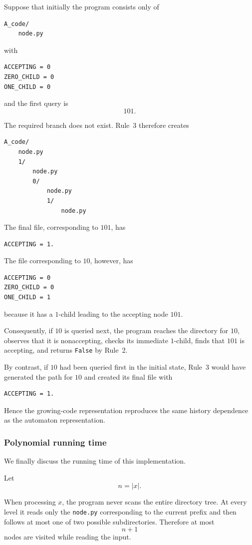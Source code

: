 \documentclass[11pt]{article}
\begin{document}
Suppose that initially the program consists only of
\begin{verbatim}
A_code/
    node.py
\end{verbatim}
with
\begin{verbatim}
ACCEPTING = 0
ZERO_CHILD = 0
ONE_CHILD = 0
\end{verbatim}

and the first query is
\[
101.
\]

The required branch does not exist.  Rule~3 therefore creates
\begin{verbatim}
A_code/
    node.py
    1/
        node.py
        0/
            node.py
            1/
                node.py
\end{verbatim}

The final file, corresponding to \(101\), has
\begin{verbatim}
ACCEPTING = 1.
\end{verbatim}

The file corresponding to \(10\), however, has
\begin{verbatim}
ACCEPTING = 0
ZERO_CHILD = 0
ONE_CHILD = 1
\end{verbatim}

because it has a \(1\)-child leading to the accepting node \(101\).

Consequently, if \(10\) is queried next, the program reaches the directory
for \(10\), observes that it is nonaccepting, checks its immediate
\(1\)-child, finds that \(101\) is accepting, and returns
\texttt{False} by Rule~2.

By contrast, if \(10\) had been queried first in the initial state,
Rule~3 would have generated the path for \(10\) and created its final file
with
\begin{verbatim}
ACCEPTING = 1.
\end{verbatim}

Hence the growing-code representation reproduces the same history
dependence as the automaton representation.

\subsubsection*{Polynomial running time}

We finally discuss the running time of this implementation.

Let
\[
n=|x|.
\]

When processing \(x\), the program never scans the entire directory tree.
At every level it reads only the \texttt{node.py} corresponding to the
current prefix and then follows at most one of two possible subdirectories.
Therefore at most
\[
n+1
\]
nodes are visited while reading the input.
\end{document}

